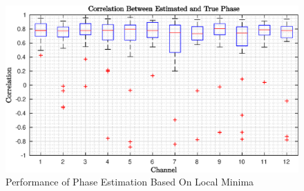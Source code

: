 \begin{figure}
	\begin{center}
		\includegraphics[width=\textwidth]{figures/local_minima_phase.eps}
		\caption{Performance of Phase Estimation Based On Local Minima}
		\label{fig:local_minima_phase}
	\end{center}
\end{figure}
